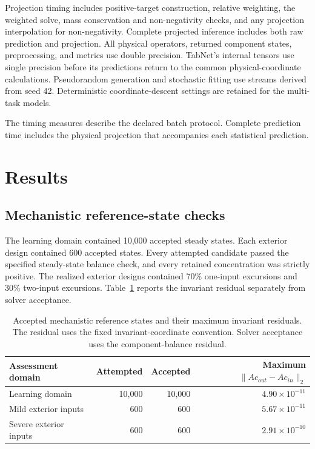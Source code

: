 Projection timing includes positive-target construction, relative weighting, the weighted solve, mass conservation and non-negativity checks, and any projection interpolation for non-negativity. Complete projected inference includes both raw prediction and projection. All physical operators, returned component states, preprocessing, and metrics use double precision. TabNet's internal tensors use single precision before its predictions return to the common physical-coordinate calculations. Pseudorandom generation and stochastic fitting use streams derived from seed 42. Deterministic coordinate-descent settings are retained for the multi-task models.

The timing measures describe the declared batch protocol. Complete prediction time includes the physical projection that accompanies each statistical prediction.

\section{Results}
\label{sec:projection_results}

\subsection{Mechanistic reference-state checks}

The learning domain contained 10,000 accepted steady states. Each exterior design contained 600 accepted states. Every attempted candidate passed the specified steady-state balance check, and every retained concentration was strictly positive. The realized exterior designs contained 70\% one-input excursions and 30\% two-input excursions. Table~\ref{tab:projection_dataset_results} reports the invariant residual separately from solver acceptance.

\begin{table}[htbp]
\centering\small
\caption{Accepted mechanistic reference states and their maximum invariant residuals. The residual uses the fixed invariant-coordinate convention. Solver acceptance uses the component-balance residual.}
\label{tab:projection_dataset_results}
\begin{tabular}{lrrr}
\toprule
Assessment domain & Attempted & Accepted & Maximum $\|Ac_{out}-Ac_{in}\|_2$\\
\midrule
Learning domain & 10,000 & 10,000 & $4.90\times10^{-11}$\\
Mild exterior inputs & 600 & 600 & $5.67\times10^{-11}$\\
Severe exterior inputs & 600 & 600 & $2.91\times10^{-10}$\\
\bottomrule
\end{tabular}
\end{table}


